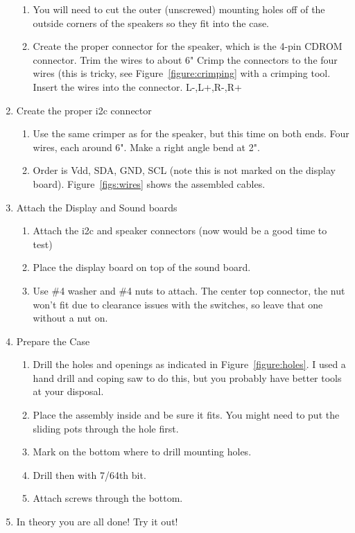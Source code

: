 \documentclass[11pt]{article}
\begin{document}
\begin{enumerate}
\begin{enumerate}
		\item	You will need to cut the outer (unscrewed) mounting holes
			off of the outside corners of the speakers so they fit into
			the case.

		\item Create the proper connector for the speaker, which is the 4-pin CDROM
			connector.  Trim the wires to about 6"
			Crimp the connectors to the four wires (this is tricky, see
			Figure~\ref{figure:crimping} with a crimping tool.
			Insert the wires into the connector. L-,L+,R-,R+

		\end{enumerate}

	\item Create the proper i2c connector
		\begin{enumerate}
		\item	Use the same crimper as for the speaker, but this time on both
			ends.  Four wires, each around 6".  Make a right angle bend at 2".
		\item Order is Vdd, SDA, GND, SCL (note this is not marked on
			the display board).
			Figure~\ref{figs:wires} shows the assembled cables.
		\end{enumerate}

	\item Attach the Display and Sound boards

		\begin{enumerate}

		\item Attach the i2c and speaker connectors
			(now would be a good time to test)

		\item Place the display board on top of the sound board.
		\item	Use \#4 washer and \#4 nuts to attach.
			The center top connector, the nut won't
			fit due to clearance issues with
			the switches, so leave that one without a nut on.
		\end{enumerate}

	\item Prepare the Case
		\begin{enumerate}
		\item	Drill the holes and openings as indicated in
			Figure~\ref{figure:holes}.
			I used a hand drill and coping saw to do this, but you
			probably have better tools at your disposal.
		\item Place the assembly inside and be sure it fits.
			You might need to put the sliding pots through the hole first.
		\item Mark on the bottom where to drill mounting holes.
		\item Drill then with 7/64th bit.
		\item Attach screws through the bottom.
		\end{enumerate}

	\item In theory you are all done!  Try it out!

\end{enumerate}
\end{document}
